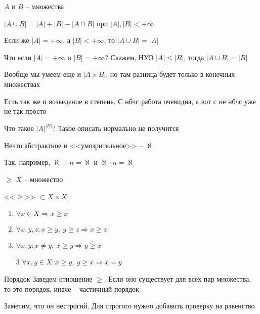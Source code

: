 \documentclass[12pt]{article}
\begin{document}
\begin{theo}{}
    $A$ и $B$ -- множества

    $|A \cup B| = |A| + |B| - |A \cap B|$ при $|A|, |B| < + \infty$

    Если же $|A| = + \infty$, а $|B| < + \infty$, то $|A \cup B| = |A|$

    Что если $|A| = + \infty$ и $|B| = + \infty$? Скажем, НУО $|A| \leq |B|$, тогда $|A \cup B| = |B|$

\begin{Remark}{}
    Вообще мы умеем еще и $|A \times B|$, но там разница будет только в конечных множествах
\end{Remark}

    Есть так же и возведение в степень. С нбчс работа очевидна, а вот с не нбчс уже не так просто

    Что такое $|A|^{|B|}$? Такое описать нормально не получится

    \begin{defin}{}
        Нечто абстрактное и <<умозрительное>> -- $\aleph$

        Так, например, $\aleph + n = \aleph$ и $\aleph \cdot n = \aleph$
    \end{defin}
\end{theo}

\begin{defin}{$\geq$}
    $X$ -- множество
    
    <<$\geq$>> $\subset X \times X$

    \begin{enumerate}
        \item $\forall x \in X \Rightarrow x \geq x$
        \item $\forall x, y, z : x \geq y,\ y \geq z \Rightarrow x \geq z$
        \item $\forall x, y : x \neq y,\ x \geq y \Rightarrow \overline{y \geq x}$
        \item[$\tilde{3}$] $\forall x, y \in X : x \geq y,\ y \geq x \Rightarrow x = y$
    \end{enumerate}
\end{defin}

\begin{theo}{Порядок}
    Заведем отношение $\geq$. Если оно существует для всех пар множества, то это порядок, иначе -- частичный порядок

    Заметим, что он нестрогий. Для строгого нужно добавить проверку на равенство
\end{theo}
\end{document}

